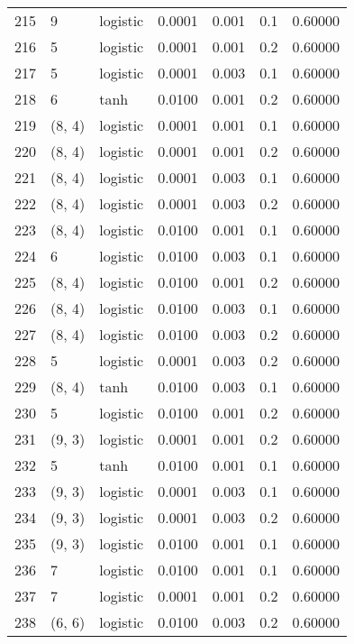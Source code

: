 \begin{tabular}{lllrrrr}
215 &           9 &  logistic &  0.0001 &  0.001 &  0.1 &   0.60000 \\
216 &           5 &  logistic &  0.0001 &  0.001 &  0.2 &   0.60000 \\
217 &           5 &  logistic &  0.0001 &  0.003 &  0.1 &   0.60000 \\
218 &           6 &      tanh &  0.0100 &  0.001 &  0.2 &   0.60000 \\
219 &      (8, 4) &  logistic &  0.0001 &  0.001 &  0.1 &   0.60000 \\
220 &      (8, 4) &  logistic &  0.0001 &  0.001 &  0.2 &   0.60000 \\
221 &      (8, 4) &  logistic &  0.0001 &  0.003 &  0.1 &   0.60000 \\
222 &      (8, 4) &  logistic &  0.0001 &  0.003 &  0.2 &   0.60000 \\
223 &      (8, 4) &  logistic &  0.0100 &  0.001 &  0.1 &   0.60000 \\
224 &           6 &  logistic &  0.0100 &  0.003 &  0.1 &   0.60000 \\
225 &      (8, 4) &  logistic &  0.0100 &  0.001 &  0.2 &   0.60000 \\
226 &      (8, 4) &  logistic &  0.0100 &  0.003 &  0.1 &   0.60000 \\
227 &      (8, 4) &  logistic &  0.0100 &  0.003 &  0.2 &   0.60000 \\
228 &           5 &  logistic &  0.0001 &  0.003 &  0.2 &   0.60000 \\
229 &      (8, 4) &      tanh &  0.0100 &  0.003 &  0.1 &   0.60000 \\
230 &           5 &  logistic &  0.0100 &  0.001 &  0.2 &   0.60000 \\
231 &      (9, 3) &  logistic &  0.0001 &  0.001 &  0.2 &   0.60000 \\
232 &           5 &      tanh &  0.0100 &  0.001 &  0.1 &   0.60000 \\
233 &      (9, 3) &  logistic &  0.0001 &  0.003 &  0.1 &   0.60000 \\
234 &      (9, 3) &  logistic &  0.0001 &  0.003 &  0.2 &   0.60000 \\
235 &      (9, 3) &  logistic &  0.0100 &  0.001 &  0.1 &   0.60000 \\
236 &           7 &  logistic &  0.0100 &  0.001 &  0.1 &   0.60000 \\
237 &           7 &  logistic &  0.0001 &  0.001 &  0.2 &   0.60000 \\
238 &      (6, 6) &  logistic &  0.0100 &  0.003 &  0.2 &   0.60000 \\

\end{tabular}
